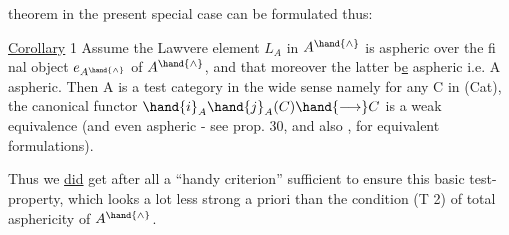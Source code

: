 
theorem in the present special case can be formulated thus:

\uline{Corollary} 1  Assume the Lawvere element $L_A$ in $A^{\hand{\wedge}}$ is aspheric over the fi%
nal object $e_{A^{\hand{\wedge}}}$ of $A^{\hand{\wedge}}$,  and that moreover the latter b\uline{e} aspheric i.e. A
aspheric.  Then A is a test category in the wide sense\hand{,} namely for any
C in (Cat),  the canonical functor  $\hand{i}_A\hand{j}_A(C)\hand{\longrightarrow} C$  is a weak equivalence
(and even aspheric -  see prop.   30, \hand{(}and also
, for equivalent formulations\deleted{)}).

Thus we \uline{did} get after all a ``handy criterion'' sufficient to ensure
this basic test-property,  which looks a lot less strong  a priori
than the condition (T 2) \inserted{[plus T1, T3]} of total asphericity of $A^{\hand{\wedge}}$.


